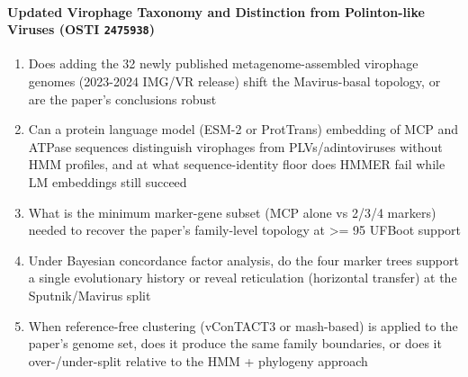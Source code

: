 \documentclass[11pt]{article}
\begin{document}
\paragraph{Updated Virophage Taxonomy and Distinction from Polinton-like Viruses \textnormal{\small(OSTI \texttt{2475938})}}
\begin{enumerate}[leftmargin=1.6em,itemsep=0.2em,topsep=0.2em,label=Q\arabic*.]
\item Does adding the 32 newly published metagenome-assembled virophage genomes (2023-2024 IMG/VR release) shift the Mavirus-basal topology, or are the paper's conclusions robust
\item Can a protein language model (ESM-2 or ProtTrans) embedding of MCP and ATPase sequences distinguish virophages from PLVs/adintoviruses without HMM profiles, and at what sequence-identity floor does HMMER fail while LM embeddings still succeed
\item What is the minimum marker-gene subset (MCP alone vs 2/3/4 markers) needed to recover the paper's family-level topology at \textgreater{}= 95 UFBoot support
\item Under Bayesian concordance factor analysis, do the four marker trees support a single evolutionary history or reveal reticulation (horizontal transfer) at the Sputnik/Mavirus split
\item When reference-free clustering (vConTACT3 or mash-based) is applied to the paper's genome set, does it produce the same family boundaries, or does it over-/under-split relative to the HMM + phylogeny approach
\end{enumerate}
\end{document}
